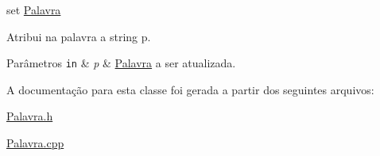 set \hyperlink{classPalavra}{Palavra} 

Atribui na palavra a string p. 
\begin{DoxyParams}[1]{Parâmetros}
\mbox{\tt in}  & {\em p} & \hyperlink{classPalavra}{Palavra} a ser atualizada. \\
\hline
\end{DoxyParams}


A documentação para esta classe foi gerada a partir dos seguintes arquivos\+:\begin{DoxyCompactItemize}
\item 
\hyperlink{Palavra_8h}{Palavra.\+h}\item 
\hyperlink{Palavra_8cpp}{Palavra.\+cpp}\end{DoxyCompactItemize}

